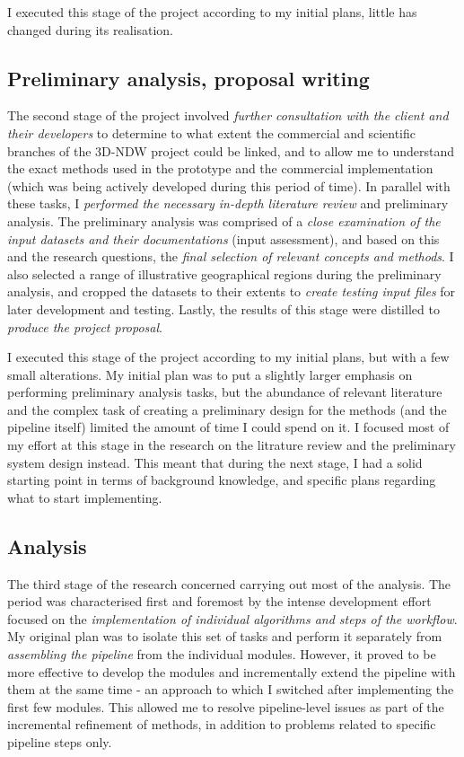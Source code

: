 I executed this stage of the project according to my initial plans, little has changed during its realisation.

\subsection{Preliminary analysis, proposal writing}
\label{sub:preliminaryanalysis}

The second stage of the project involved \textit{further consultation with the client and their developers} to determine to what extent the commercial and scientific branches of the 3D-NDW project could be linked, and to allow me to understand the exact methods used in the prototype and the commercial implementation (which was being actively developed during this period of time). In parallel with these tasks, I \textit{performed the necessary in-depth literature review} and preliminary analysis. The preliminary analysis was comprised  of a \textit{close examination of the input datasets and their documentations} (input assessment), and based on this and the research questions, the \textit{final selection of relevant concepts and methods}. I also selected a range of illustrative geographical regions during the preliminary analysis, and cropped the datasets to their extents to \textit{create testing input files} for later development and testing. Lastly, the results of this stage were distilled to \textit{produce the project proposal}.

I executed this stage of the project according to my initial plans, but with a few small alterations. My initial plan was to put a slightly larger emphasis on performing preliminary analysis tasks, but the abundance of relevant literature and the complex task of creating a preliminary design for the methods (and the pipeline itself) limited the amount of time I could spend on it. I focused most of my effort at this stage in the research on the litrature review and the preliminary system design instead. This meant that during the next stage, I had a solid starting point in terms of background knowledge, and specific plans regarding what to start implementing.

\subsection{Analysis}
\label{sub:analysis}

The third stage of the research concerned carrying out most of the analysis. The period was characterised first and foremost by the intense development effort focused on the \textit{implementation of individual algorithms and steps of the workflow}. My original plan was to isolate this set of tasks and perform it separately from \textit{assembling the pipeline} from the individual modules. However, it proved to be more effective to develop the modules and incrementally extend the pipeline with them at the same time - an approach to which I switched after implementing the first few modules. This allowed me to resolve pipeline-level issues as part of the incremental refinement of methods, in addition to problems related to specific pipeline steps only.

